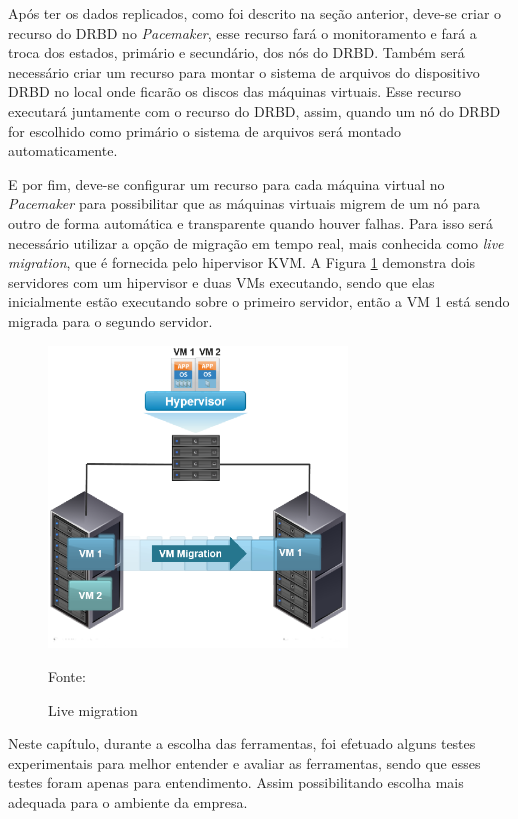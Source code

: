 Após ter os dados replicados, como foi descrito na seção anterior, deve-se criar o recurso do \ac{DRBD} no \textit{Pacemaker}, esse recurso fará o
monitoramento e fará a troca dos estados, primário e secundário, dos nós do \ac{DRBD}.
Também será necessário criar um recurso para montar o sistema de arquivos do dispositivo \ac{DRBD} no local onde ficarão os discos das máquinas
virtuais. Esse recurso executará juntamente com o recurso do \ac{DRBD}, assim, quando um nó do \ac{DRBD} for escolhido como primário o sistema de
arquivos será montado automaticamente.

E por fim, deve-se configurar um recurso para cada máquina virtual no \textit{Pacemaker} para possibilitar que as
máquinas virtuais migrem de um nó para outro de forma automática e transparente quando houver falhas. Para isso será necessário utilizar a 
opção de migração em tempo real, mais conhecida como \textit{live migration}, que é fornecida pelo hipervisor \ac{KVM}.
A Figura \ref{fig:vms_migration} demonstra dois servidores com um hipervisor e duas \ac{VM}s executando, sendo que elas inicialmente estão 
executando sobre o primeiro servidor, então a \ac{VM} 1 está sendo migrada para o segundo servidor.


\begin{figure}[h!]
 \centering
 \includegraphics[width=300px]{img/vms_migration.eps}
 \caption{Live migration}
 Fonte: \citet{spaniol2015}
 \label{fig:vms_migration}
\end{figure}

Neste capítulo, durante a escolha das ferramentas, foi efetuado alguns testes experimentais para melhor entender e avaliar as ferramentas, 
sendo que esses testes foram apenas para entendimento. Assim possibilitando escolha mais adequada para o ambiente da empresa.

